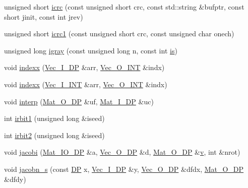 \begin{DoxyCompactItemize}
\item 
unsigned short \mbox{\hyperlink{namespaceNR_a05984f00dc053f5191e68179570e42f0}{icrc}} (const unsigned short crc, const std\+::string \&bufptr, const short jinit, const int jrev)
\item 
unsigned short \mbox{\hyperlink{namespaceNR_a8eecd14f5dbacae9a1c719b3f8d5fe77}{icrc1}} (const unsigned short crc, const unsigned char onech)
\item 
unsigned long \mbox{\hyperlink{namespaceNR_a4965006048ac8b1e627c9e21b9d6c1f8}{igray}} (const unsigned long n, const int \mbox{\hyperlink{x_8cc_a81abbbdef81e25584a2eab888e643d3d}{is}})
\item 
void \mbox{\hyperlink{namespaceNR_a16cc62d4d994e6557e4d85d1b5de0ff9}{indexx}} (\mbox{\hyperlink{namespaceNR_a9f943da53862537c552e2a770cb170ae}{Vec\+\_\+\+I\+\_\+\+DP}} \&arr, \mbox{\hyperlink{namespaceNR_ade2338f6d53b7da3dd6d1c04804541f2}{Vec\+\_\+\+O\+\_\+\+I\+NT}} \&indx)
\item 
void \mbox{\hyperlink{namespaceNR_ab3cd4fa2aeff189dee20cd3f87378212}{indexx}} (\mbox{\hyperlink{namespaceNR_ae67ce7dc86a8a64a7ce73c3c030ff610}{Vec\+\_\+\+I\+\_\+\+I\+NT}} \&arr, \mbox{\hyperlink{namespaceNR_ade2338f6d53b7da3dd6d1c04804541f2}{Vec\+\_\+\+O\+\_\+\+I\+NT}} \&indx)
\item 
void \mbox{\hyperlink{namespaceNR_af65d3c7d1b9eddb10dd001e6456ea45a}{interp}} (\mbox{\hyperlink{namespaceNR_adc1f8da33094b6bbeb1f5f899515ce54}{Mat\+\_\+\+O\+\_\+\+DP}} \&uf, \mbox{\hyperlink{namespaceNR_a2b8abfda8fffad6ba0a1b5a4c0773dbf}{Mat\+\_\+\+I\+\_\+\+DP}} \&uc)
\item 
int \mbox{\hyperlink{namespaceNR_a8847cb5906daead1ccf717166c61b0d7}{irbit1}} (unsigned long \&iseed)
\item 
int \mbox{\hyperlink{namespaceNR_a826f4788e674ad205145876a7ddd04e0}{irbit2}} (unsigned long \&iseed)
\item 
void \mbox{\hyperlink{namespaceNR_ab9427d0f2503bbbc8a531c2e06f9369e}{jacobi}} (\mbox{\hyperlink{namespaceNR_ad1513aa4697878ed3bff0b8b3c9dd910}{Mat\+\_\+\+I\+O\+\_\+\+DP}} \&a, \mbox{\hyperlink{namespaceNR_a970094d23441f8ef6a45282a7eb2103d}{Vec\+\_\+\+O\+\_\+\+DP}} \&d, \mbox{\hyperlink{namespaceNR_adc1f8da33094b6bbeb1f5f899515ce54}{Mat\+\_\+\+O\+\_\+\+DP}} \&\mbox{\hyperlink{hadron__timeslice_8cc_a716fc87f5e814be3ceee2405ed6ff22a}{v}}, int \&nrot)
\item 
void \mbox{\hyperlink{namespaceNR_a98c0d038f8153db652155a23d8fca0c5}{jacobn\+\_\+s}} (const \mbox{\hyperlink{namespaceNR_af6ff762dd605ff477b8e52387253a02a}{DP}} x, \mbox{\hyperlink{namespaceNR_a9f943da53862537c552e2a770cb170ae}{Vec\+\_\+\+I\+\_\+\+DP}} \&y, \mbox{\hyperlink{namespaceNR_a970094d23441f8ef6a45282a7eb2103d}{Vec\+\_\+\+O\+\_\+\+DP}} \&dfdx, \mbox{\hyperlink{namespaceNR_adc1f8da33094b6bbeb1f5f899515ce54}{Mat\+\_\+\+O\+\_\+\+DP}} \&dfdy)

\end{DoxyCompactItemize}
